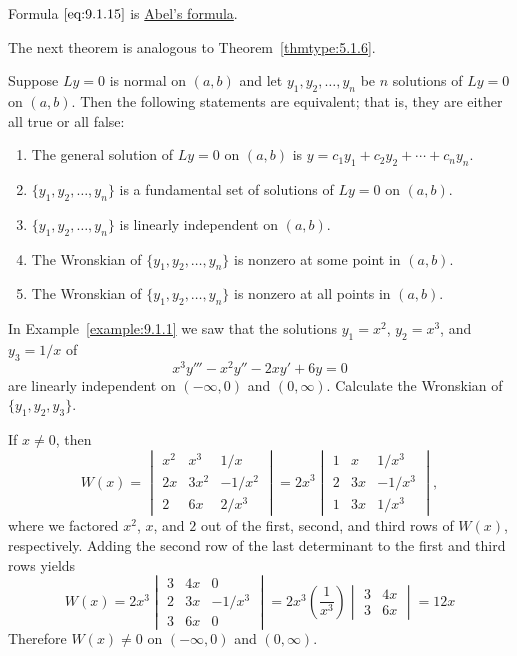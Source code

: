 \documentclass{ximera}
\begin{document}
Formula $\eqref{eq:9.1.15}$ is
\href{https://en.wikipedia.org/wiki/Abel%27s_identity}{Abel's formula}.

The next theorem is analogous to
Theorem~\ref{thmtype:5.1.6}.

\begin{theorem}\label{thmtype:9.1.4}
Suppose $Ly=0$ is normal on $(a,b)$ and let $y_1, y_2, \dots, y_n$
be $n$ solutions of $Ly=0$ on $(a,b)$. Then the following statements
are equivalent;  that is, they are either all true or all false:
\begin{enumerate}
\item\label{item:9.1.4a} %
The general solution of $Ly=0$ on $(a,b)$ is
$y=c_1y_1+c_2y_2+\cdots+c_ny_n$.
\item\label{item:9.1.4b} %
 $\{y_1,y_2,\dots,y_n\}$ is a fundamental set of solutions of
$Ly=0$ on $(a,b)$.
\item\label{item:9.1.4c} %
$\{y_1,y_2,\dots,y_n\}$ is linearly independent on $(a,b)$.
\item\label{item:9.1.4d} %
The Wronskian of $\{y_1,y_2,\dots,y_n\}$ is nonzero at some point in
$(a,b)$.
\item\label{item:9.1.4e} %
The Wronskian of $\{y_1,y_2,\dots,y_n\}$ is nonzero at all points in
$(a,b)$.
\end{enumerate}
\end{theorem}

\begin{example}\label{example:9.1.3}
In Example~\ref{example:9.1.1} we saw that the solutions $y_1=x^2$,
$y_2=x^3$, and $y_3=1/x$ of
$$
x^3y'''-x^2y''-2xy'+6y=0
$$
are linearly independent on $(-\infty,0)$ and $(0,\infty)$. Calculate
the Wronskian  of $\{y_1,y_2,y_3\}$.

\begin{explanation}
If $x\neq 0$,  then
$$
W(x)=\begin{vmatrix}
x^2&x^3&1/x\\
2x&3x^2&-1/x^2\\
2&6x&2/x^3\end{vmatrix}
=2x^3\begin{vmatrix}
1&x&1/x^3\\2&3x&-1/x^3
\\1&3x&1/x^3\end{vmatrix},
$$
where we factored $x^2$, $x$, and $2$ out of the first, second, and
third  rows of
$W(x)$, respectively. Adding the second row of the last determinant
to the first and third rows yields
$$
W(x)=2x^3\begin{vmatrix}
3&4x&0\\
2&3x&-1/x^3\\
3&6x&0\end{vmatrix}
=2x^3\left(\frac{1}{x^3}\right)\begin{vmatrix}3&4x\\3&6x
\end{vmatrix}=12x
$$
Therefore $W(x)\neq 0$ on $(-\infty,0)$ and $(0,\infty)$.
\end{explanation}
\end{example}
\end{document}
